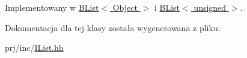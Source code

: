 Implementowany w \hyperlink{class_b_list_a510b274bdcccf50699b41233a5f42a5f}{B\-List$<$ Object $>$} i \hyperlink{class_b_list_a510b274bdcccf50699b41233a5f42a5f}{B\-List$<$ unsigned $>$}.



Dokumentacja dla tej klasy została wygenerowana z pliku\-:\begin{DoxyCompactItemize}
\item 
prj/inc/\hyperlink{_i_list_8hh}{I\-List.\-hh}\end{DoxyCompactItemize}

